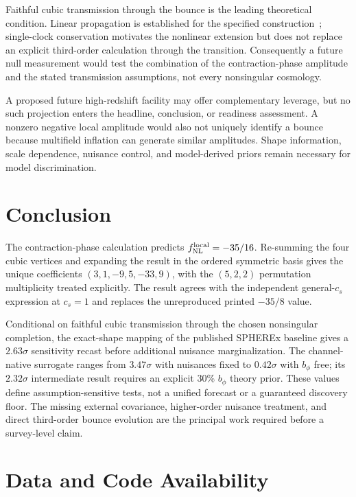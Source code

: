 \documentclass[aps,prd,twocolumn,superscriptaddress,showpacs,preprintnumbers,nofootinbib,longbibliography,floatfix]{revtex4-2}
\newcommand{\fnl}{f_{\rm NL}}
\begin{document}
Faithful cubic transmission through the bounce is the leading theoretical condition. Linear propagation is established for the specified construction~\cite{WilsonEwing:2012}; single-clock conservation motivates the nonlinear extension but does not replace an explicit third-order calculation through the transition. Consequently a future null measurement would test the combination of the contraction-phase amplitude and the stated transmission assumptions, not every nonsingular cosmology.

A proposed future high-redshift facility may offer complementary leverage, but no such projection enters the headline, conclusion, or readiness assessment. A nonzero negative local amplitude would also not uniquely identify a bounce because multifield inflation can generate similar amplitudes. Shape information, scale dependence, nuisance control, and model-derived priors remain necessary for model discrimination.
\section{Conclusion}
\label{sec:conclusion}

The contraction-phase calculation predicts $\fnl^{\rm local}=-35/16$. Re-summing the four cubic vertices and expanding the result in the ordered symmetric basis gives the unique coefficients $(3,1,-9,5,-33,9)$, with the $(5,2,2)$ permutation multiplicity treated explicitly. The result agrees with the independent general-$c_s$ expression at $c_s=1$ and replaces the unreproduced printed $-35/8$ value.

Conditional on faithful cubic transmission through the chosen nonsingular completion, the exact-shape mapping of the published SPHEREx baseline gives a $2.63\sigma$ sensitivity recast before additional nuisance marginalization. The channel-native surrogate ranges from $3.47\sigma$ with nuisances fixed to $0.42\sigma$ with $b_\phi$ free; its $2.32\sigma$ intermediate result requires an explicit 30\% $b_\phi$ theory prior. These values define assumption-sensitive tests, not a unified forecast or a guaranteed discovery floor. The missing external covariance, higher-order nuisance treatment, and direct third-order bounce evolution are the principal work required before a survey-level claim.

\section*{Data and Code Availability}
\end{document}
